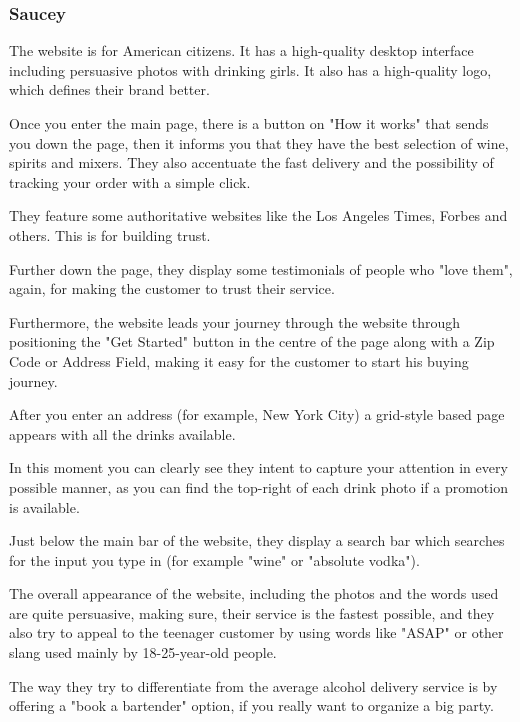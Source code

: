 \documentclass[12p]{article}
\begin{document}
\subsubsection{Saucey \cite{Saucey}}
The website is for American citizens. It has a high-quality desktop interface including persuasive photos with drinking girls. It also has a high-quality logo, which defines their brand better.

Once you enter the main page, there is a button on "How it works" that sends you down the page, then it informs you that they have the best selection of wine, spirits and mixers. They also accentuate the fast delivery and the possibility of tracking your order with a simple click.

They feature some authoritative websites like the Los Angeles Times, Forbes and others. This is for building trust.

Further down the page, they display some testimonials of people who "love them", again, for making the customer to trust their service.

Furthermore, the website leads your journey through the website through positioning the "Get Started" button in the centre of the page along with a Zip Code or Address Field, making it easy for the customer to start his buying journey.

After you enter an address (for example, New York City) a grid-style based page appears with all the drinks available.

In this moment you can clearly see they intent to capture your attention in every possible manner, as you can find the top-right of each drink photo if a promotion is available.

Just below the main bar of the website, they display a search bar which searches for the input you type in (for example "wine" or "absolute vodka").

The overall appearance of the website, including the photos and the words used are quite persuasive, making sure, their service is the fastest possible, and they also try to appeal to the teenager customer by using words like "ASAP" or other slang used mainly by 18-25-year-old people.

The way they try to differentiate from the average alcohol delivery service is by offering a "book a bartender" option, if you really want to organize a big party.
\end{document}
